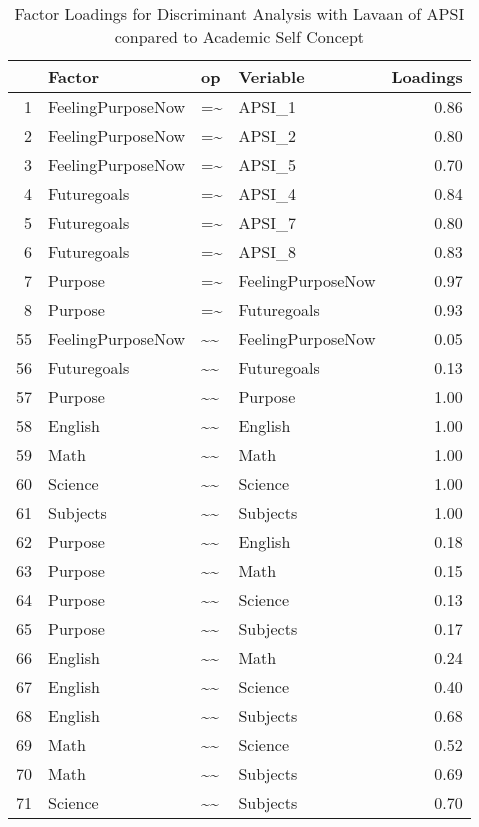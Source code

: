 \documentclass{article}\usepackage[]{graphicx}\usepackage[]{color}
\begin{document}
\begin{table}[ht]
\centering
\begin{tabular}{rlllr}
  \hline
 & Factor & op & Veriable & Loadings \\ 
  \hline
1 & FeelingPurposeNow & =\~{} & APSI\_1 & 0.86 \\ 
  2 & FeelingPurposeNow & =\~{} & APSI\_2 & 0.80 \\ 
  3 & FeelingPurposeNow & =\~{} & APSI\_5 & 0.70 \\ 
  4 & Futuregoals & =\~{} & APSI\_4 & 0.84 \\ 
  5 & Futuregoals & =\~{} & APSI\_7 & 0.80 \\ 
  6 & Futuregoals & =\~{} & APSI\_8 & 0.83 \\ 
  7 & Purpose & =\~{} & FeelingPurposeNow & 0.97 \\ 
  8 & Purpose & =\~{} & Futuregoals & 0.93 \\ 
  55 & FeelingPurposeNow & \~{}\~{} & FeelingPurposeNow & 0.05 \\ 
  56 & Futuregoals & \~{}\~{} & Futuregoals & 0.13 \\ 
  57 & Purpose & \~{}\~{} & Purpose & 1.00 \\ 
  58 & English & \~{}\~{} & English & 1.00 \\ 
  59 & Math & \~{}\~{} & Math & 1.00 \\ 
  60 & Science & \~{}\~{} & Science & 1.00 \\ 
  61 & Subjects & \~{}\~{} & Subjects & 1.00 \\ 
  62 & Purpose & \~{}\~{} & English & 0.18 \\ 
  63 & Purpose & \~{}\~{} & Math & 0.15 \\ 
  64 & Purpose & \~{}\~{} & Science & 0.13 \\ 
  65 & Purpose & \~{}\~{} & Subjects & 0.17 \\ 
  66 & English & \~{}\~{} & Math & 0.24 \\ 
  67 & English & \~{}\~{} & Science & 0.40 \\ 
  68 & English & \~{}\~{} & Subjects & 0.68 \\ 
  69 & Math & \~{}\~{} & Science & 0.52 \\ 
  70 & Math & \~{}\~{} & Subjects & 0.69 \\ 
  71 & Science & \~{}\~{} & Subjects & 0.70 \\ 
   \hline
\end{tabular}
\caption{Factor Loadings for Discriminant Analysis with Lavaan of APSI conpared to Academic Self Concept} 
\end{table}
\end{document}
